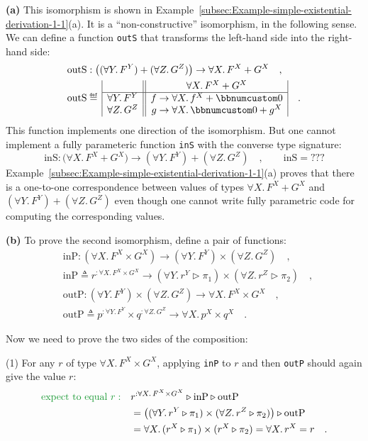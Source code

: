 \textbf{(a)} This isomorphism is shown in Example~\ref{subsec:Example-simple-existential-derivation-1-1}(a).
It is a \textsf{``}non-constructive\textsf{''} isomorphism, in the following sense.
We can define a function \lstinline!outS! that transforms the left-hand
side into the right-hand side:
\begin{align*}
 & \text{outS}:\big((\forall Y.\,F^{Y})+(\forall Z.\,G^{Z})\big)\rightarrow\forall X.\,F^{X}+G^{X}\quad,\\
 & \text{outS}\triangleq\,\begin{array}{|c||c|}
 & \forall X.\,F^{X}+G^{X}\\
\hline \forall Y.\,F^{Y} & f\rightarrow\forall X.\,f^{X}+\bbnum 0\\
\forall Z.\,G^{Z} & g\rightarrow\forall X.\,\bbnum 0+g^{X}
\end{array}\quad.
\end{align*}
This function implements one direction of the isomorphism. But one
cannot implement a fully parameteric function \lstinline!inS! with
the converse type signature:
\[
\text{inS}:\big(\forall X.\,F^{X}+G^{X}\big)\rightarrow(\forall Y.\,F^{Y})+(\forall Z.\,G^{Z})\quad,\quad\quad\text{inS}=???
\]
Example~\ref{subsec:Example-simple-existential-derivation-1-1}(a)
proves that there is a one-to-one correspondence between values of
types $\forall X.\,F^{X}+G^{X}$ and $(\forall Y.\,F^{Y})+(\forall Z.\,G^{Z})$
even though one cannot write fully parametric code for computing the
corresponding values.

\textbf{(b)} To prove the second isomorphism, define a pair of functions:
\begin{align*}
 & \text{inP}:(\forall X.\,F^{X}\times G^{X})\rightarrow(\forall Y.\,F^{Y})\times(\forall Z.\,G^{Z})\quad,\\
 & \text{inP}\triangleq r^{:\forall X.\,F^{X}\times G^{X}}\rightarrow(\forall Y.\,r^{Y}\triangleright\pi_{1})\times(\forall Z.\,r^{Z}\triangleright\pi_{2})\quad,\\
 & \text{outP}:(\forall Y.\,F^{Y})\times(\forall Z.\,G^{Z})\rightarrow\forall X.\,F^{X}\times G^{X}\quad,\\
 & \text{outP}\triangleq p^{:\forall Y.\,F^{Y}}\times q^{:\forall Z.\,G^{Z}}\rightarrow\forall X.\,p^{X}\times q^{X}\quad.
\end{align*}

Now we need to prove the two sides of the composition:

(1) For any $r$ of type $\forall X.\,F^{X}\times G^{X}$, applying
\lstinline!inP! to $r$ and then \lstinline!outP! should again give
the value $r$:
\begin{align*}
{\color{greenunder}\text{expect to equal }r:}\quad & r^{:\forall X.\,F^{X}\times G^{X}}\triangleright\text{inP}\triangleright\text{outP}\\
 & =\big((\forall Y.\,r^{Y}\triangleright\pi_{1})\times(\forall Z.\,r^{Z}\triangleright\pi_{2})\big)\triangleright\text{outP}\\
 & =\forall X.\,(r^{X}\triangleright\pi_{1})\times(r^{X}\triangleright\pi_{2})=\forall X.\,r^{X}=r\quad.
\end{align*}

